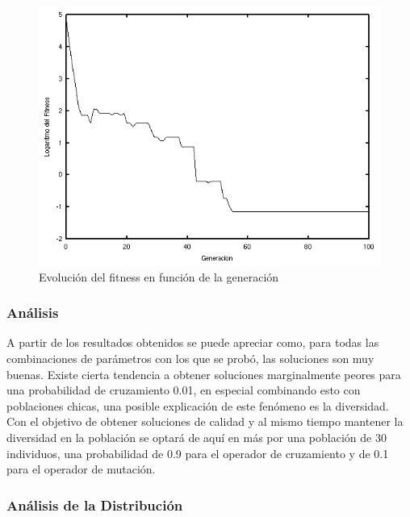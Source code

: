 \documentclass[journal]{IEEEtran}
\begin{document}
\begin{figure}[h]
\centering
\includegraphics[width=\linewidth]{evolution.png}
\caption{Evolución del fitness en función de la generación}
\label{fig:evolution}
\end{figure}

\subsubsection*{Análisis}

A partir de los resultados obtenidos se puede apreciar como, para todas las combinaciones de parámetros con los que se probó, las soluciones son muy buenas. Existe cierta tendencia a obtener soluciones marginalmente peores para una probabilidad de cruzamiento 0.01, en especial combinando esto con poblaciones chicas, una posible explicación de este fenómeno es la diversidad.\\

Con el objetivo de obtener soluciones de calidad y al mismo tiempo mantener la diversidad en la población se optará de aquí en más por una población de 30 individuos, una probabilidad de 0.9 para el operador de cruzamiento y de 0.1 para el operador de mutación.\\

\subsubsection*{Análisis de la Distribución}
\end{document}

